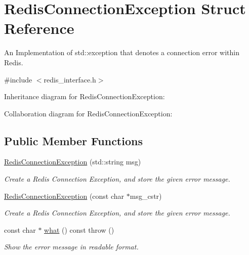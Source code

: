 \hypertarget{structRedisConnectionException}{}\section{Redis\+Connection\+Exception Struct Reference}
\label{structRedisConnectionException}


An Implementation of std\+::exception that denotes a connection error within Redis.  




{\ttfamily \#include $<$redis\+\_\+interface.\+h$>$}



Inheritance diagram for Redis\+Connection\+Exception\+:


Collaboration diagram for Redis\+Connection\+Exception\+:
\subsection*{Public Member Functions}
\begin{DoxyCompactItemize}
\item 
\hyperlink{structRedisConnectionException_a1a28a564f37ca6c032222fc57611fe7d}{Redis\+Connection\+Exception} (std\+::string msg)\hypertarget{structRedisConnectionException_a1a28a564f37ca6c032222fc57611fe7d}{}\label{structRedisConnectionException_a1a28a564f37ca6c032222fc57611fe7d}

\begin{DoxyCompactList}\small\item\em Create a Redis Connection Exception, and store the given error message. \end{DoxyCompactList}\item 
\hyperlink{structRedisConnectionException_a5af84b976ba7c84d4891c8b42d0c0b34}{Redis\+Connection\+Exception} (const char $\ast$msg\+\_\+cstr)\hypertarget{structRedisConnectionException_a5af84b976ba7c84d4891c8b42d0c0b34}{}\label{structRedisConnectionException_a5af84b976ba7c84d4891c8b42d0c0b34}

\begin{DoxyCompactList}\small\item\em Create a Redis Connection Exception, and store the given error message. \end{DoxyCompactList}\item 
const char $\ast$ \hyperlink{structRedisConnectionException_a309897cb6e68eea573b2db478543cb16}{what} () const   throw ()\hypertarget{structRedisConnectionException_a309897cb6e68eea573b2db478543cb16}{}\label{structRedisConnectionException_a309897cb6e68eea573b2db478543cb16}

\begin{DoxyCompactList}\small\item\em Show the error message in readable format. \end{DoxyCompactList}\end{DoxyCompactItemize}
